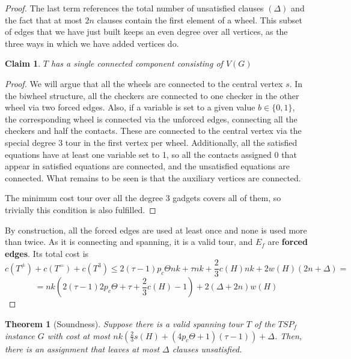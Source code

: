 \documentclass[12pt]{article}
\newtheorem{theorem}{Theorem}
\newtheorem{claim}{Claim}
\begin{document}
\begin{proof}
    The last term references the total number of unsatisfied clauses $(\Delta)$ and the fact that at most $2n$ clauses contain the first element of a wheel. 
    This subset of edges that we have just built keeps an even degree over all vertices, as the three ways in which we have added vertices do. 
    \begin{claim}$T$ has a single connected component consisting of $V(G)$
    \end{claim}
    \begin{proof}
         We will argue that all the wheels are connected to the central vertex $s$. 
        In the biwheel structure, all the checkers are connected to one checker in the other wheel via two forced edges. 
        Also, if a variable is set to a given value $b\in\{0,1\}$, the corresponding wheel is connected via the unforced edges, connecting all the checkers and half the contacts.
        These are connected to the central vertex via the special degree 3 tour in the first vertex per wheel.
        Additionally, all the satisfied equations have at least one variable set to 1, so all the contacts assigned 0 that appear in satisfied equations are connected, and the unsatisfied equations are connected. 
        What remains to be seen is that the auxiliary vertices are connected.
        
        The minimum cost tour over all the degree 3 gadgets covers all of them, so trivially this condition is also fulfilled.
    \end{proof}
    By construction, all the forced edges are used at least once and none is used more than twice. As it is connecting and spanning, it is a valid tour, and $E_f$ are \textbf{forced edges}. 
    Its total cost is 
    \[c(T^{\not =})+c(T^=)+c(T^3)\leq 2(\tau-1)p_c\Theta nk+ \tau nk+\frac{2}{3}c(H)nk+2w(H) (2n+\Delta)=\]
    \[=nk(2 (\tau-1)2p_c\Theta+\tau+\frac{2}{3}c(H)-1)+ 2(\Delta+2n)w(H)\]
\end{proof}
\begin{theorem}[Soundness]\label{soundness}
    Suppose there is a valid spanning tour $T$ of the $TSP_f$ instance $G$ with cost at most $ nk(\frac{2}{3}s(H)+(4p_c\Theta +1) (\tau-1))+\Delta$. Then, there is an assignment that leaves at most $\Delta$ clauses unsatisfied.
\end{theorem}
\end{document}
